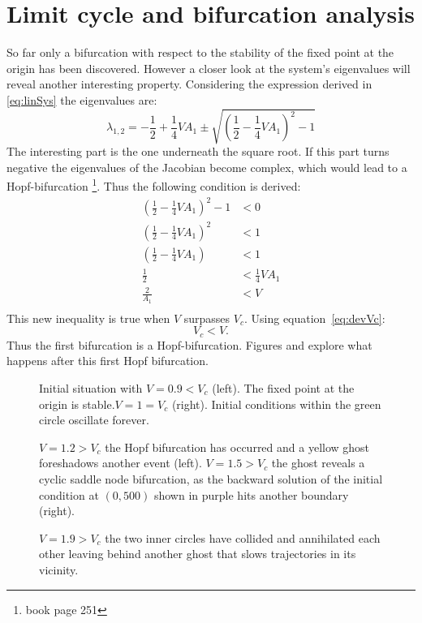 \section{Limit cycle and bifurcation analysis}
So far only a bifurcation with respect to the stability of the fixed point at the origin has been discovered. However a closer look at the system's eigenvalues will reveal another interesting property. Considering the expression derived in \ref{eq:linSys} the eigenvalues are:
\begin{equation}
\lambda_{1,2} = -\frac{1}{2} + \frac{1}{4}VA_1 \pm \sqrt{(\frac{1}{2}-\frac{1}{4}VA_1)^2 - 1}
\end{equation}
The interesting part is the one underneath the square root. If this part turns negative the eigenvalues of the Jacobian become complex, which would lead to a Hopf-bifurcation \footnote{book page 251}. Thus the following condition is derived:
\begin{align}
(\frac{1}{2} - \frac{1}{4}VA_1)^2 - 1 &< 0 \\
(\frac{1}{2} - \frac{1}{4}VA_1)^2  &< 1 \\
(\frac{1}{2} - \frac{1}{4}VA_1) &< 1 \\
\frac{1}{2}  &< \frac{1}{4}VA_1  \\
\frac{2}{A_1} &< V \\
\end{align}
This new inequality is true when $V$ surpasses $V_c$. Using equation~\ref{eq:devVc}:
\begin{equation}
V_c < V.
\end{equation}
Thus the first bifurcation is a Hopf-bifurcation. Figures and explore what happens after this first Hopf bifurcation.

\begin{figure}


\caption{Initial situation with $V = 0.9 < V_c$ (left). The fixed point at the origin is stable.$V = 1 = V_c$  (right). Initial conditions within the green circle oscillate forever.}


\caption{$V = 1.2 > V_c$ the Hopf bifurcation has occurred and a yellow ghost foreshadows another event (left). $V=1.5 > V_c$ the ghost reveals a cyclic saddle node bifurcation, as the backward solution of the initial condition at $(0,500)$ shown in purple hits another boundary (right).}

\caption{$V = 1.9 > V_c$ the two inner circles have collided and annihilated each other leaving behind another ghost that slows trajectories in its vicinity.}
\end{figure}


